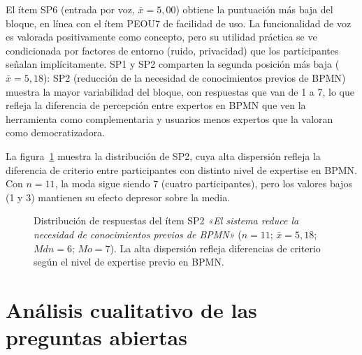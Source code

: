 El ítem SP6 (entrada por voz, $\bar{x} = 5{,}00$) obtiene la puntuación más baja del bloque, en línea con el ítem PEOU7 de facilidad de uso. La funcionalidad de voz es valorada positivamente como concepto, pero su utilidad práctica se ve condicionada por factores de entorno (ruido, privacidad) que los participantes señalan implícitamente. SP1 y SP2 comparten la segunda posición más baja ($\bar{x} = 5{,}18$): SP2 (reducción de la necesidad de conocimientos previos de BPMN) muestra la mayor variabilidad del bloque, con respuestas que van de 1 a 7, lo que refleja la diferencia de percepción entre expertos en BPMN que ven la herramienta como complementaria y usuarios menos expertos que la valoran como democratizadora.


La figura~\ref{fig:barchart-sp2} muestra la distribución de SP2, cuya alta dispersión refleja la diferencia de criterio entre participantes con distinto nivel de expertise en BPMN. Con $n=11$, la moda sigue siendo 7 (cuatro participantes), pero los valores bajos (1 y 3) mantienen su efecto depresor sobre la media.

\begin{figure}[H]
\centering
{}
\caption{Distribución de respuestas del ítem SP2 \emph{«El sistema reduce la necesidad de conocimientos previos de BPMN»} ($n=11$;\; $\bar{x}=5{,}18$;\; $Mdn=6$;\; $Mo=7$). La alta dispersión refleja diferencias de criterio según el nivel de expertise previo en BPMN.}
\label{fig:barchart-sp2}
\end{figure}

\section{Análisis cualitativo de las preguntas abiertas}\label{sec:cualitativo}

